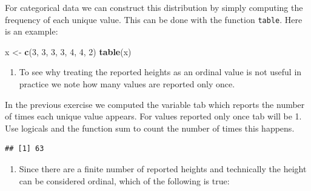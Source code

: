 \documentclass[
]{article}
\newenvironment{Shaded}{\begin{snugshade}}{\end{snugshade}}
\newcommand{\DecValTok}[1]{\textcolor[rgb]{0.00,0.00,0.81}{#1}}
\newcommand{\KeywordTok}[1]{\textcolor[rgb]{0.13,0.29,0.53}{\textbf{#1}}}
\newcommand{\NormalTok}[1]{#1}
\newcommand{\OperatorTok}[1]{\textcolor[rgb]{0.81,0.36,0.00}{\textbf{#1}}}
\newcommand{\StringTok}[1]{\textcolor[rgb]{0.31,0.60,0.02}{#1}}
\providecommand{\tightlist}{%
  \setlength{\itemsep}{0pt}\setlength{\parskip}{0pt}}
\begin{document}
For categorical data we can construct this distribution by simply
computing the frequency of each unique value. This can be done with the
function \texttt{table}. Here is an example:

\begin{Shaded}
\begin{Highlighting}[]
\NormalTok{x <-}\StringTok{ }\KeywordTok{c}\NormalTok{(}\DecValTok{3}\NormalTok{, }\DecValTok{3}\NormalTok{, }\DecValTok{3}\NormalTok{, }\DecValTok{3}\NormalTok{, }\DecValTok{4}\NormalTok{, }\DecValTok{4}\NormalTok{, }\DecValTok{2}\NormalTok{)}
\KeywordTok{table}\NormalTok{(x)}
\end{Highlighting}
\end{Shaded}

\begin{Shaded}
\end{Shaded}

\begin{enumerate}
\def\labelenumi{\arabic{enumi}.}
\setcounter{enumi}{4}
\tightlist
\item
  To see why treating the reported heights as an ordinal value is not
  useful in practice we note how many values are reported only once.
\end{enumerate}

In the previous exercise we computed the variable tab which reports the
number of times each unique value appears. For values reported only once
tab will be 1. Use logicals and the function sum to count the number of
times this happens.

\begin{Shaded}
\end{Shaded}

\begin{verbatim}
## [1] 63
\end{verbatim}

\begin{enumerate}
\def\labelenumi{\arabic{enumi}.}
\setcounter{enumi}{5}
\tightlist
\item
  Since there are a finite number of reported heights and technically
  the height can be considered ordinal, which of the following is true:
\end{enumerate}
\end{document}

